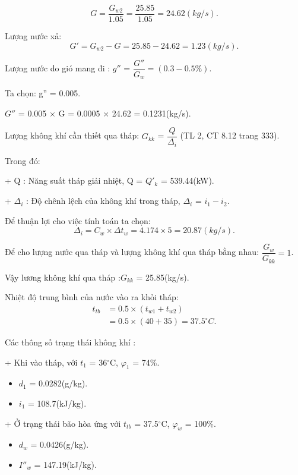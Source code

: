 \begin{equation*}
	 G = \dfrac{G_{w2}}{1.05}= \dfrac{25.85}{1.05}=24.62(kg/s).
\end{equation*}

Lượng nước xả:
\begin{equation*}
	G' = G_{w2} - G = 25.85 - 24.62 = 1.23(kg/s).
\end{equation*}

Lượng nước do gió mang đi : $g''$ = $\dfrac{G''}{G_{w}} = (0.3 - 0.5\%)$.

Ta chọn: g'' = 0.005.

$G''$ = 0.005 $\times$ G = 0.0005 $\times$ 24.62 = 0.1231(kg/s).

Lượng không khí cần thiết qua tháp:
$G_{kk}$ = $\dfrac{Q}{\Delta_{i}}$ (TL 2, CT 8.12 trang 333).

Trong đó:

+ Q : Năng suất tháp giải nhiệt, Q = $Q'_{k}$ = 539.44(kW).

+ $\Delta_{i}$ : Độ chênh lệch của không khí trong tháp, $\Delta_{i}$ = $i_{1} - i_{2}$.  

Để thuận lợi cho việc tính toán ta chọn:
\begin{equation*}
	\Delta_{i} = C_{w} \times \Delta t_{w} = 4.174 \times 5 = 20.87(kg/s).
\end{equation*}

Để cho lượng nước qua tháp và lượng không khí qua tháp bằng nhau: $\dfrac{G_{w}}{G_{kk}} = 1$.

Vậy lương không khí qua tháp :$G_{kk}$ = 25.85(kg/s).

Nhiệt độ trung bình của nước vào ra khỏi tháp:
\begin{equation*}
	\begin{split}
		t_{tb}& = 0.5 \times (t_{w1} + t_{w2})\\ 
		      & = 0.5 \times (40 + 35) = 37.5^{\circ}C.
	\end{split}
\end{equation*}

Các thông số trạng thái không khí :

+ Khi vào tháp, với $t_{1}$ = 36$^{\circ}$C, $\varphi_{1}$ = 74\%.
\begin{itemize}
	\item $d_{1}$ = 0.0282(g/kg).
	\item $i_{1}$ = 108.7(kJ/kg).
\end{itemize}

+ Ở trạng thái bão hòa ứng với $t_{tb}$ = 37.5$^{\circ}$C, $\varphi_{w}$ = 100\%.
\begin{itemize}
	\item $d_{w}$ = 0.0426(g/kg).
	\item $I''_{w}$ = 147.19(kJ/kg).
\end{itemize}

